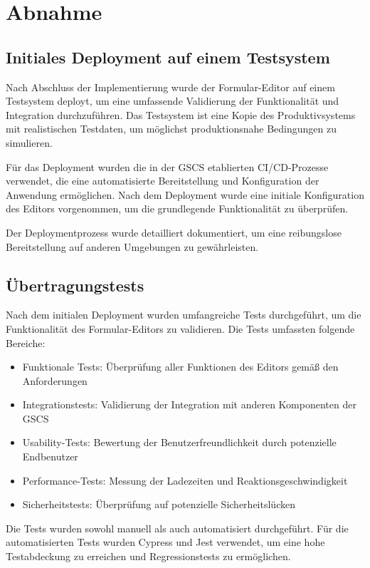 \documentclass[a4paper,11pt]{article}
\begin{document}
\section{Abnahme}
\subsection{Initiales Deployment auf einem Testsystem}
Nach Abschluss der Implementierung wurde der Formular-Editor auf einem Testsystem deployt, um eine umfassende Validierung der Funktionalität und Integration durchzuführen. Das Testsystem ist eine Kopie des Produktivsystems mit realistischen Testdaten, um möglichst produktionsnahe Bedingungen zu simulieren.

\noindent Für das Deployment wurden die in der GSCS etablierten CI/CD-Prozesse verwendet, die eine automatisierte Bereitstellung und Konfiguration der Anwendung ermöglichen. Nach dem Deployment wurde eine initiale Konfiguration des Editors vorgenommen, um die grundlegende Funktionalität zu überprüfen.

\noindent Der Deploymentprozess wurde detailliert dokumentiert, um eine reibungslose Bereitstellung auf anderen Umgebungen zu gewährleisten.

\subsection{Übertragungstests}
Nach dem initialen Deployment wurden umfangreiche Tests durchgeführt, um die Funktionalität des Formular-Editors zu validieren. Die Tests umfassten folgende Bereiche:

\begin{itemize}
  \item Funktionale Tests: Überprüfung aller Funktionen des Editors gemäß den Anforderungen
  \item Integrationstests: Validierung der Integration mit anderen Komponenten der GSCS
  \item Usability-Tests: Bewertung der Benutzerfreundlichkeit durch potenzielle Endbenutzer
  \item Performance-Tests: Messung der Ladezeiten und Reaktionsgeschwindigkeit
  \item Sicherheitstests: Überprüfung auf potenzielle Sicherheitslücken
\end{itemize}

Die Tests wurden sowohl manuell als auch automatisiert durchgeführt. Für die automatisierten Tests wurden Cypress und Jest verwendet, um eine hohe Testabdeckung zu erreichen und Regressionstests zu ermöglichen.
\end{document}
